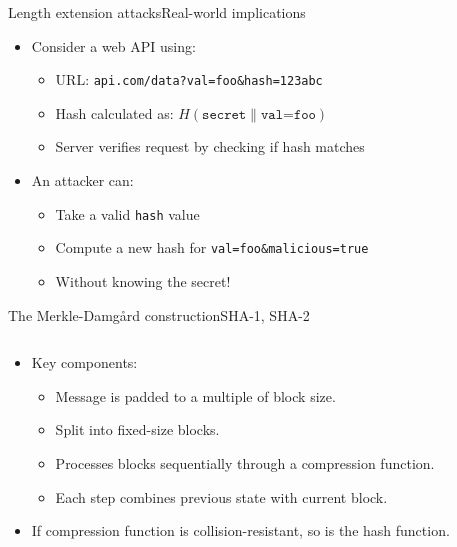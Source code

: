 \documentclass[aspectratio=169, lualatex, handout]{beamer}
\begin{document}
\begin{frame}{Length extension attacks}{Real-world implications}
	\begin{itemize}[<+->]
		\item Consider a web API using:
		      \begin{itemize}
			      \item URL: \texttt{api.com/data?val=foo\&hash=123abc}
			      \item Hash calculated as: $H(\texttt{secret} \| \texttt{val=foo})$
			      \item Server verifies request by checking if hash matches
		      \end{itemize}
		\item An attacker can:
		      \begin{itemize}
			      \item Take a valid \texttt{hash} value
			      \item Compute a new hash for \texttt{val=foo\&malicious=true}
			      \item Without knowing the secret!
		      \end{itemize}
	\end{itemize}
\end{frame}

\begin{frame}{The Merkle-Damg\aa rd construction}{SHA-1, SHA-2}
	\begin{columns}[c]
		\begin{column}{0.45\textwidth}
			\begin{itemize}[<+->]
				\item Key components:
				      \begin{itemize}
					      \item Message is padded to a multiple of block size.
					      \item Split into fixed-size blocks.
					      \item Processes blocks sequentially through a compression function.
					      \item Each step combines previous state with current block.
				      \end{itemize}
				\item If compression function is collision-resistant, so is the hash function.
			\end{itemize}
		\end{column}
		\begin{column}{0.55\textwidth}
		\end{column}
	\end{columns}
\end{frame}
\end{document}
